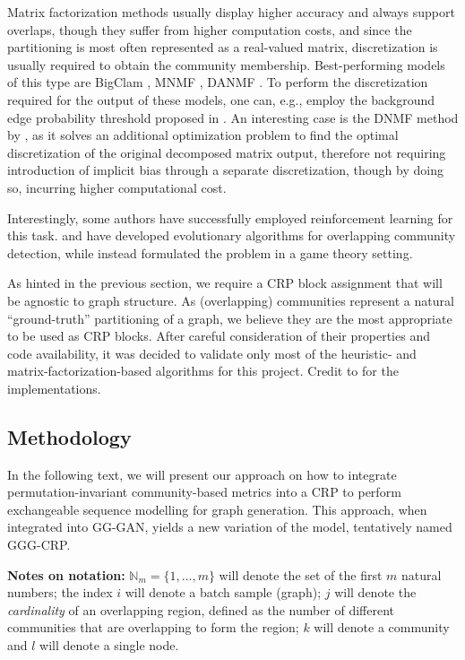 Matrix factorization methods usually display higher accuracy and always support overlaps, though they suffer from higher computation costs, and since the partitioning is most often represented as a real-valued matrix, discretization is usually required to obtain the community membership. Best-performing models of this type are BigClam \cite{yang_overlapping_2013}, MNMF \cite{wang_community_2017}, DANMF \cite{ye_deep_2018}. To perform the discretization required for the output of these models, one can, e.g., employ the background edge probability threshold proposed in \cite{jia_communitygan_2019}. An interesting case is the DNMF method by \cite{ye_discrete_2019}, as it solves an additional optimization problem to find the optimal discretization of the original decomposed matrix output, therefore not requiring introduction of implicit bias through a separate discretization, though by doing so, incurring higher computational cost.

Interestingly, some authors have successfully employed reinforcement learning for this task. \cite{zhang_mixed_2017} and \cite{bello-orgaz_multi-objective_2018} have developed evolutionary algorithms for overlapping community detection, while \cite{wang_effective_2021} instead formulated the problem in a game theory setting. 

As hinted in the previous section, we require a CRP block assignment that will be agnostic to graph structure. As (overlapping) communities represent a natural \enquote{ground-truth} partitioning of a graph, we believe they are the most appropriate to be used as CRP blocks. After careful consideration of their properties and code availability, it was decided to validate only most of the heuristic- and matrix-factorization-based algorithms for this project. Credit to \cite{csardi_igraph_2006, rozemberczki_karate_2020, li_local_2018, janchevski_dnmf-python_2022} for the implementations.

\subsection{Methodology}
\label{sec:methodology_gggcrp}

In the following text, we will present our approach on how to integrate permutation-invariant community-based metrics into a CRP to perform exchangeable sequence modelling for graph generation. This approach, when integrated into GG-GAN, yields a new variation of the model, tentatively named GGG-CRP. 

\textbf{Notes on notation:} $\mathbb{N}_{m} = \{1,\dots,m\}$ will denote the set of the first $m$ natural numbers; the index $i$ will denote a batch sample (graph); $j$ will denote the \emph{cardinality} of an overlapping region, defined as the number of different communities that are overlapping to form the region; $k$ will denote a community and $l$ will denote a single node.

